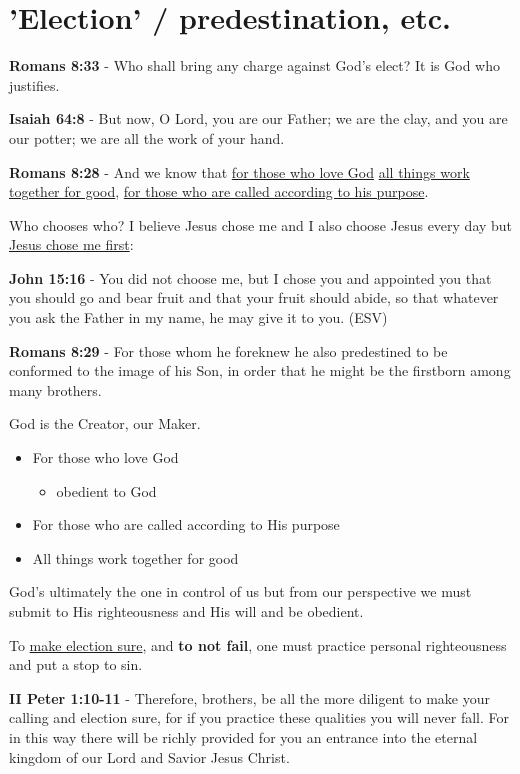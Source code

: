 \documentclass[11pt]{article}
\begin{document}
\section{'Election' / predestination, etc.}
\label{sec:orge3d047c}
\textbf{Romans 8:33} - Who shall bring any charge against God's elect? It is God who justifies.

\textbf{Isaiah 64:8} - But now, O Lord, you are our Father; we are the clay, and you are our potter; we are all the work of your hand.

\textbf{Romans 8:28} - And we know that \uline{for those who love God} \uline{all things work together for good}, \uline{for those who are called according to his purpose}.

Who chooses who? I believe Jesus chose me and I also choose Jesus every day but \uline{Jesus chose me first}:

\textbf{John 15:16} - You did not choose me, but I chose you and appointed you that you should go and bear fruit and that your fruit should abide, so that whatever you ask the Father in my name, he may give it to you. (ESV)

\textbf{Romans 8:29} - For those whom he foreknew he also predestined to be conformed to the image of his Son, in order that he might be the firstborn among many brothers.

God is the Creator, our Maker.

\begin{itemize}
\item For those who love God
\begin{itemize}
\item obedient to God
\end{itemize}
\item For those who are called according to His purpose
\item All things work together for good
\end{itemize}

God's ultimately the one in control of us but from our perspective we must submit to His righteousness and His will and be obedient.

To \uline{make election sure}, and \textbf{to not fail}, one must practice personal righteousness and put a stop to sin.

\textbf{II Peter 1:10-11} - Therefore, brothers, be all the more diligent to make your calling and election sure, for if you practice these qualities you will never fall. For in this way there will be richly provided for you an entrance into the eternal kingdom of our Lord and Savior Jesus Christ.
\end{document}

